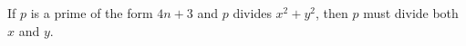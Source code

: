 If $p$ is a prime of the form $4n + 3$ and $p$ divides $x^2 + y^2$, then $p$ must divide both $x$ and $y$.
